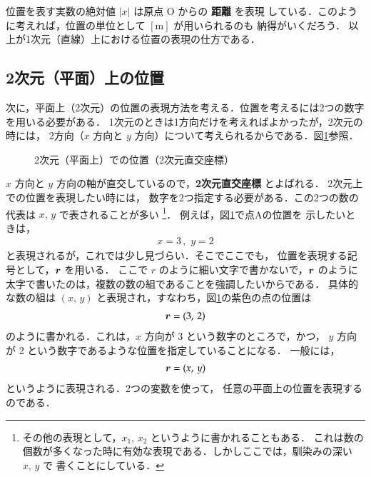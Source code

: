                 位置を表す実数の絶対値 $|x|$ は原点 O からの \textbf{距離} を表現
                している．このように考えれば，位置の単位として $\mathrm{[m]}$ が用いられるのも
                納得がいくだろう．
                以上が1次元（直線）上における位置の表現の仕方である．

        \subsection{2次元（平面）上の位置}
                次に，平面上（2次元）の位置の表現方法を考える．位置を考えるには2つの数字を用いる必要がある．
                1次元のときは1方向だけを考えればよかったが，2次元の時には，
                2方向（$x$ 方向と $y$ 方向）について考えられるからである．図\ref{fig:ichi2}参照．
                \begin{figure}[hbt]
                        \begin{center}
                        \caption{2次元（平面上）での位置（2次元直交座標）}
                        \label{fig:ichi2}
                    \end{center}
                \end{figure}

                $x$ 方向と $y$ 方向の軸が直交しているので，\textbf{2次元直交座標} とよばれる．
                2次元上での位置を表現したい時には，
                数字を2つ指定する必要がある．この2つの数の代表は $x,\,y$ で表されることが多い
                \footnote{
                    その他の表現として，$x_{1},\,x_{2}$ というように書かれることもある．
                    これは数の個数が多くなった時に有効な表現である．しかしここでは，馴染みの深い $x,\,y$ で
                    書くことにしている．
                }．
                例えば，図\ref{fig:ichi2}で点Aの位置を
                示したいときは，
                \begin{align*}
                x=3\,,\,\,y=2
                \end{align*}
                と表現されるが，これでは少し見づらい．そこでここでも，
                位置を表現する記号として，$\boldsymbol{r}$ を用いる．
                ここで $r$ のように細い文字で書かないで，$\boldsymbol{r}$ のように
                太字で書いたのは，複数の数の組であることを強調したいからである．
                具体的な数の組は $(x,\,y)$ と表現され，すなわち，図\ref{fig:ichi2}の紫色の点の位置は
                \begin{align}
                \boldsymbol{r}=(3,\,2)
                \end{align}
                のように書かれる．これは，$x$ 方向が 3 という数字のところで，かつ，
                $y$ 方向が 2 という数字であるような位置を指定していることになる．
                一般には，
                \begin{align}
                \boldsymbol{r}=(x,\,y)
                \end{align}
                というように表現される．2つの変数を使って，
                任意の平面上の位置を表現するのである．

